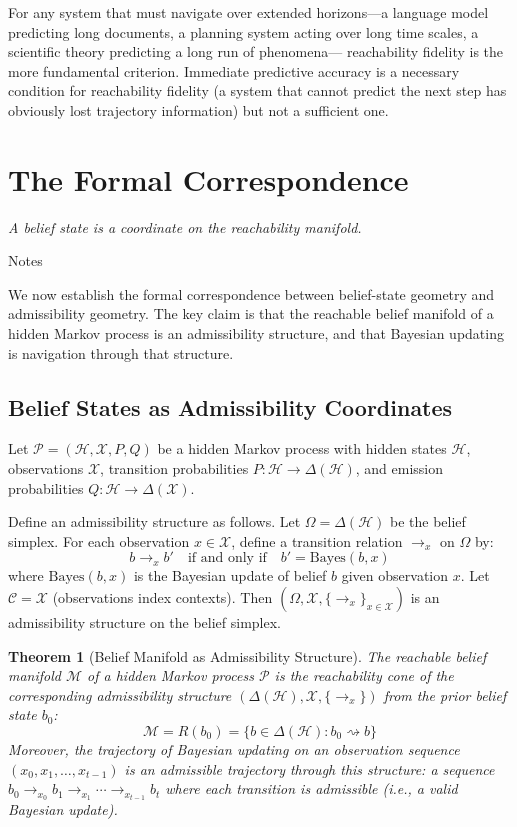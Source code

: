 \documentclass[12pt, a4paper]{article}
\theoremstyle{plain}
\newtheorem{theorem}{Theorem}[section]
\theoremstyle{definition}
\theoremstyle{remark}
\begin{document}
For any system that must navigate over extended horizons---a language
model predicting long documents, a planning system acting over long
time scales, a scientific theory predicting a long run of phenomena---
reachability fidelity is the more fundamental criterion. Immediate
predictive accuracy is a necessary condition for reachability fidelity
(a system that cannot predict the next step has obviously lost trajectory
information) but not a sufficient one.

\section{The Formal Correspondence}

\epigraph{\textit{A belief state is a coordinate on the reachability manifold.}}{Notes}

\noindent
We now establish the formal correspondence between belief-state geometry
and admissibility geometry. The key claim is that the reachable belief
manifold of a hidden Markov process is an admissibility structure, and
that Bayesian updating is navigation through that structure.

\subsection{Belief States as Admissibility Coordinates}

Let $\mathcal{P} = (\mathcal{H}, \mathcal{X}, P, Q)$ be a hidden Markov
process with hidden states $\mathcal{H}$, observations $\mathcal{X}$,
transition probabilities $P: \mathcal{H} \to \Delta(\mathcal{H})$, and
emission probabilities $Q: \mathcal{H} \to \Delta(\mathcal{X})$.

Define an admissibility structure as follows. Let $\Omega = \Delta(\mathcal{H})$
be the belief simplex. For each observation $x \in \mathcal{X}$, define
a transition relation $\to_x$ on $\Omega$ by:
$$b \to_x b' \quad \text{if and only if} \quad b' = \text{Bayes}(b, x)$$
where $\text{Bayes}(b, x)$ is the Bayesian update of belief $b$ given
observation $x$. Let $\mathcal{C} = \mathcal{X}$ (observations index contexts).
Then $(\Omega, \mathcal{X}, \{\to_x\}_{x \in \mathcal{X}})$ is an admissibility
structure on the belief simplex.

\begin{theorem}[Belief Manifold as Admissibility Structure]
\label{thm:belief-admiss}
The reachable belief manifold $\mathcal{M}$ of a hidden Markov process
$\mathcal{P}$ is the reachability cone of the corresponding admissibility
structure $(\Delta(\mathcal{H}), \mathcal{X}, \{\to_x\})$ from the prior
belief state $b_0$:
$$\mathcal{M} = R(b_0) = \{b \in \Delta(\mathcal{H}) : b_0 \rightsquigarrow b\}$$
Moreover, the trajectory of Bayesian updating on an observation sequence
$(x_0, x_1, \ldots, x_{t-1})$ is an admissible trajectory through this
structure: a sequence $b_0 \to_{x_0} b_1 \to_{x_1} \cdots \to_{x_{t-1}} b_t$
where each transition is admissible (i.e., a valid Bayesian update).
\end{theorem}
\end{document}
